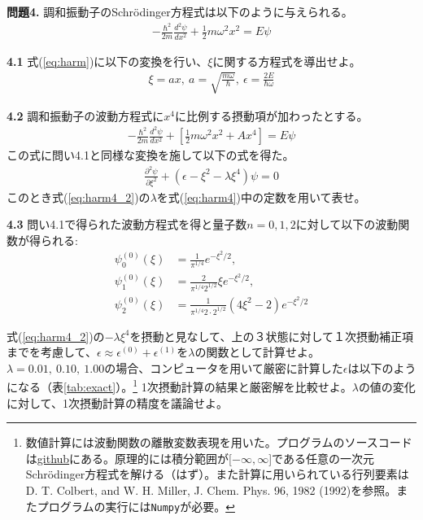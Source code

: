 \documentclass[11pt,pra,aps]{revtex4}
\begin{document}
\noindent
{\bf 問題4.} 調和振動子のSchr\"odinger方程式は以下のように与えられる。
\begin{align}
  -\frac{\hbar^2}{2m}\frac{d^2\psi}{dx^2}+\frac{1}{2}m\omega^2x^2=E\psi \label{eq:harm}
\end{align}

\noindent
{\bf 4.1} 式(\ref{eq:harm})に以下の変換を行い、$\xi$に関する方程式を導出せよ。
\begin{align}
  \xi=ax,\ a=\sqrt{\frac{m\omega}{\hbar}},\ \epsilon=\frac{2E}{\hbar\omega}
\end{align}

\noindent
{\bf 4.2} 調和振動子の波動方程式に$x^4$に比例する摂動項が加わったとする。
\begin{align}
  -\frac{\hbar^2}{2m}\frac{d^2\psi}{dx^2}+\left[\frac{1}{2}m\omega^2x^2+Ax^4\right]=E\psi \label{eq:harm4}
\end{align}
この式に問い4.1と同様な変換を施して以下の式を得た。
\begin{align}
  \frac{\partial^2\psi}{\partial \xi^2}+(\epsilon-\xi^2-\lambda\xi^4)\psi=0 \label{eq:harm4_2}
\end{align}
このとき式(\ref{eq:harm4_2})の$\lambda$を式(\ref{eq:harm4})中の定数を用いて表せ。

\noindent
{\bf 4.3} 問い4.1で得られた波動方程式を得と量子数$n=0,1,2$に対して以下の波動関数が得られる:
\begin{align}
  \psi_0^{(0)}(\xi)&=\frac{1}{\pi^{1/4}} e^{-\xi^2/2}, \\
  \psi_1^{(0)}(\xi)&=\frac{2}{\pi^{1/4}2^{1/2}} \xi e^{-\xi^2/2}, \\
  \psi_2^{(0)}(\xi)&=\frac{1}{\pi^{1/4}2\cdot 2^{1/2}} (4\xi^2-2)e^{-\xi^2/2}
\end{align}

式(\ref{eq:harm4_2})の$-\lambda\xi^4$を摂動と見なして、上の３状態に対して１次摂動補正項までを考慮して、$\epsilon\approx\epsilon^{(0)}+\epsilon^{(1)}$を$\lambda$の関数として計算せよ。$\lambda=0.01,\ 0.10,\ 1.00$の場合、コンピュータを用いて厳密に計算した$\epsilon$は以下のようになる（表\ref{tab:exact}）。\footnote{数値計算には波動関数の離散変数表現を用いた。プログラムのソースコードは\href{https://github.com/msaitow/okiba/blob/main/dvr-anharmonic.py}
 {github}にある。原理的には積分範囲が[$-\infty,\infty$]である任意の一次元Schr\"odinger方程式を解ける（はず）。また計算に用いられている行列要素はD. T. Colbert, and W. H. Miller, J. Chem. Phys. 96, 1982 (1992)を参照。またプログラムの実行には{\tt Numpy}が必要。} 1次摂動計算の結果と厳密解を比較せよ。$\lambda$の値の変化に対して、1次摂動計算の精度を議論せよ。
\end{document}
